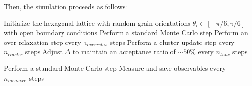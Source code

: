 Then, the simulation proceeds as follows:
\begin{algorithm}[H]
\caption{Monte Carlo Simulation Procedure}
\begin{algorithmic}[1]
\STATE Initialize the hexagonal lattice with random grain orientations $\theta_i \in [-\pi/6, \pi/6]$ with open boundary conditions
    \STATE Perform a standard Monte Carlo step
    \STATE Perform an over-relaxation step every $n_{overrelax}$ steps
    \STATE Perform a cluster update step every $n_{cluster}$ steps
    \STATE Adjust $\Delta$ to maintain an acceptance ratio of $\sim 50\%$ every $n_{tune}$ steps
\ENDFOR

    \STATE Perform a standard Monte Carlo step
    \STATE Measure and save observables every $n_{measure}$ steps
\ENDFOR
\end{algorithmic}
\end{algorithm}